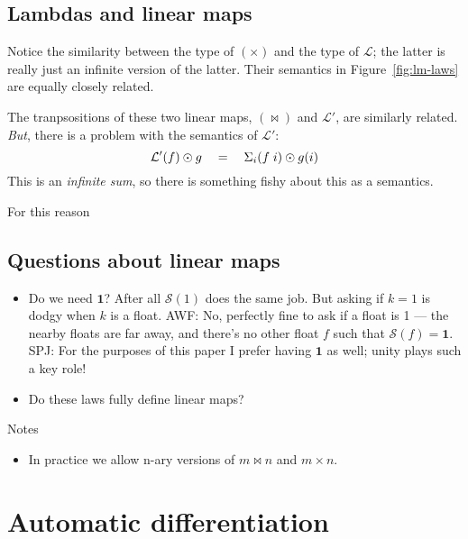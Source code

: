 \documentclass[sigplan,review]{acmart}
\newcommand{\lmapply}{\odot}   %
\newcommand{\lmcomp}{\,\circ\,}   %
\newcommand{\lmpair}{\times}         %
\newcommand{\lmjoin}{\bowtie}        %
\newcommand{\lmone}{\mathbf{1}}      %
\newcommand{\lmscalar}[1]{{\mathcal S}(#1)}      %
\newcommand{\lmlam}{{\mathcal L}}      %
\newcommand{\lmlamt}{{\mathcal L'}}     %
\newcommand{\simon}[1]{{\color{red}SPJ: #1}}
\newcommand{\awf}[1]{{\color{teal}AWF: #1}}
\begin{document}
\subsection{Lambdas and linear maps}

Notice the similarity between the type of $(\lmpair)$ and the type of $\lmlam$; the latter is really
just an infinite version of the latter.
Their semantics in Figure~\ref{fig:lm-laws} are equally closely  related.

The tranpsositions of these two linear maps, $(\lmjoin)$ and $\lmlamt$, are
similarly related. \emph{But}, there is a problem with the semantics of
$\lmlamt$:
$$
   \lmlamt(f) \lmapply g \quad = \quad \Sigma_i (f \;i) \lmapply g(i) \\
$$
This is an \emph{infinite sum}, so there is something fishy about this as a semantics.

For this reason

\subsection{Questions about linear maps}

\begin{itemize}
\item Do we need $\lmone$? After all $\lmscalar{1}$ does the same job.
  But asking if $k=1$ is dodgy when $k$ is a float. \awf{No, perfectly fine to ask if a
    float is 1 --- the nearby floats are far away, and there's no other float $f$ such that $\lmscalar f = \lmone$.}
  \simon{For the purposes of this paper I prefer having $\lmone$ as well; unity plays such a key role!}
\item Do these laws fully define linear maps?
\end{itemize}
Notes
\begin{itemize}
\item In practice we allow n-ary versions of $m \lmjoin n$ and $m \lmpair n$.
\end{itemize}

\section{Automatic differentiation}
\end{document}
